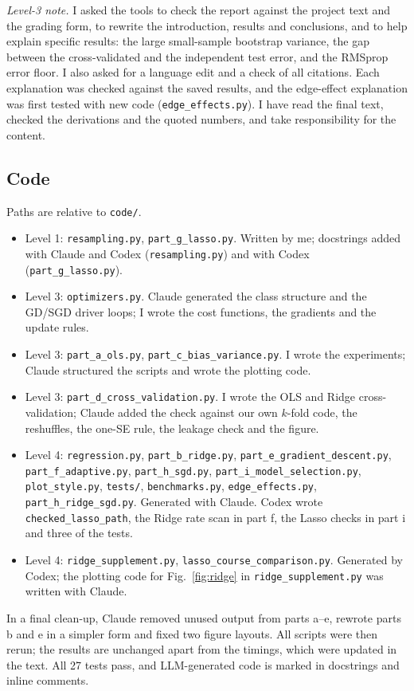 \documentclass[aps,prb,reprint,superscriptaddress,nofootinbib,longbibliography,floatfix]{revtex4-2}
\begin{document}
\emph{Level-3 note.} I asked the tools to check the report against the project text and the grading form, to rewrite the introduction, results and conclusions, and to help explain specific results: the large small-sample bootstrap variance, the gap between the cross-validated and the independent test error, and the RMSprop error floor. I also asked for a language edit and a check of all citations. Each explanation was checked against the saved results, and the edge-effect explanation was first tested with new code (\texttt{edge\_effects.py}). I have read the final text, checked the derivations and the quoted numbers, and take responsibility for the content.

\subsection{Code}
Paths are relative to \texttt{code/}.
\begin{itemize}
\item Level 1: \texttt{resampling.py}, \texttt{part\_g\_lasso.py}. Written by me; docstrings added with Claude and Codex (\texttt{resampling.py}) and with Codex (\texttt{part\_g\_lasso.py}).
\item Level 3: \texttt{optimizers.py}. Claude generated the class structure and the GD/SGD driver loops; I wrote the cost functions, the gradients and the update rules.
\item Level 3: \texttt{part\_a\_ols.py}, \texttt{part\_c\_bias\_variance.py}. I wrote the experiments; Claude structured the scripts and wrote the plotting code.
\item Level 3: \texttt{part\_d\_cross\_validation.py}. I wrote the OLS and Ridge cross-validation; Claude added the check against our own $k$-fold code, the reshuffles, the one-SE rule, the leakage check and the figure.
\item Level 4: \texttt{regression.py}, \texttt{part\_b\_ridge.py}, \texttt{part\_e\_gradient\_descent.py}, \texttt{part\_f\_adaptive.py}, \texttt{part\_h\_sgd.py}, \texttt{part\_i\_model\_selection.py}, \texttt{plot\_style.py}, \texttt{tests/}, \texttt{benchmarks.py}, \texttt{edge\_effects.py}, \texttt{part\_h\_ridge\_sgd.py}. Generated with Claude. Codex wrote \texttt{checked\_lasso\_path}, the Ridge rate scan in part f, the Lasso checks in part i and three of the tests.
\item Level 4: \texttt{ridge\_supplement.py}, \texttt{lasso\_course\_comparison.py}. Generated by Codex; the plotting code for Fig.~\ref{fig:ridge} in \texttt{ridge\_supplement.py} was written with Claude.
\end{itemize}
In a final clean-up, Claude removed unused output from parts a--e, rewrote parts b and e in a simpler form and fixed two figure layouts. All scripts were then rerun; the results are unchanged apart from the timings, which were updated in the text. All 27 tests pass, and LLM-generated code is marked in docstrings and inline comments.




\end{document}
